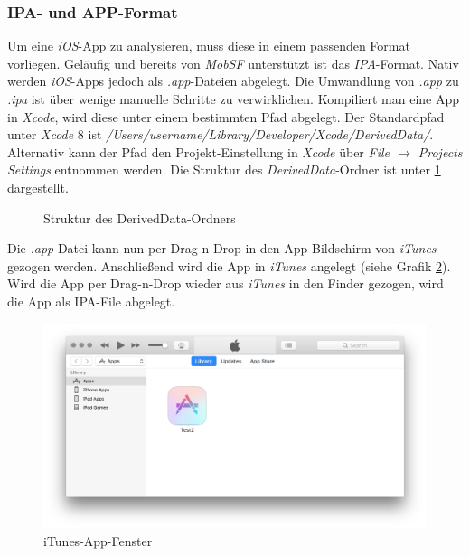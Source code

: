 \subsubsection{IPA- und APP-Format}
Um eine \textit{iOS}-App zu analysieren, muss diese in einem passenden Format vorliegen. Geläufig und bereits von \textit{MobSF} unterstützt ist das \textit{IPA}-Format. Nativ werden \textit{iOS}-Apps jedoch als \textit{.app}-Dateien abgelegt. Die Umwandlung von \textit{.app} zu \textit{.ipa} ist über wenige manuelle Schritte zu verwirklichen. Kompiliert man eine App in \textit{Xcode}, wird diese unter einem bestimmten Pfad abgelegt. Der Standardpfad unter \textit{Xcode} 8 ist \textit{/Users/username/Library/Developer/Xcode/DerivedData/}. Alternativ kann der Pfad den Projekt-Einstellung in \textit{Xcode} über \textit{File $\rightarrow$ Projects Settings} entnommen werden. Die Struktur des \textit{DerivedData}-Ordner ist unter \ref{ref:deriveddata} dargestellt.\\

\begin{figure}
\caption{Struktur des DerivedData-Ordners}
\label{ref:deriveddata}
\end{figure}

Die \textit{.app}-Datei kann nun per Drag-n-Drop in den App-Bildschirm von \textit{iTunes} gezogen werden. Anschließend wird die App in \textit{iTunes} angelegt (siehe Grafik \ref{fig:itunes_app}). Wird die App per Drag-n-Drop wieder aus \textit{iTunes} in den Finder gezogen, wird die App als IPA-File abgelegt.

\begin{figure}[htbp]
	\centering
	\includegraphics[width=\textwidth]{bilder/pentest_mobile_anwendungen/weiterentw_mobsf/itunes_app.png}
	\caption{iTunes-App-Fenster}
	\label{fig:itunes_app}
\end{figure}

